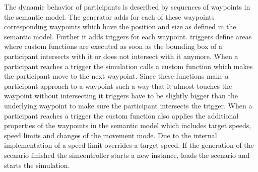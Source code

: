 The dynamic behavior of participants is described by sequences of waypoints in the semantic model.
The generator adds for each of these waypoints corresponding \beamng{} waypoints which have the position and size as defined in the semantic model.
Further it adds \lua{} triggers for each \beamng{} waypoint.
\lua{} triggers define areas where custom \lua{} functions are executed as soon as the bounding box of a participant intersects with it or does not intersect with it anymore.
When a participant reaches a \lua{} trigger the simulation calls a custom \lua{} function which makes the participant move to the next \beamng{} waypoint.
Since these functions make a participant approach to a \beamng{} waypoint such a way that it almost touches the waypoint without intersecting it \lua{} triggers have to be slightly bigger than the underlying \beamng{} waypoint to make sure the participant intersects the \lua{} trigger.
When a participant reaches a \lua{} trigger the custom \lua{} function also applies the additional properties of the waypoints in the semantic model which includes target speeds, speed limits and changes of the movement mode.
Due to the internal implementation of \beamng{} a speed limit overrides a target speed.
If the generation of the \beamng{} scenario finished the \gls{simcontroller} starts a new \beamng{} instance, loads the scenario and starts the simulation.

